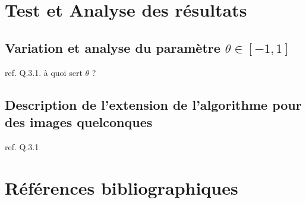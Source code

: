 \documentclass[a4paper, 12pt,twoside]{article}
\begin{document}
\clearpage


\section{Test et Analyse des résultats}

\subsection{Variation et analyse du paramètre $\theta \in [-1,1]$}
ref. Q.3.1. à quoi sert $\theta$ ?

\subsection{Description de l'extension de l’algorithme pour des images quelconques}
ref. Q.3.1

\clearpage


%
%
%
 

\section{Références bibliographiques}
        {
        \renewcommand{\section}[2]{} %
        \nocite{*} %
        
        
        }
        
    
\end{document}

